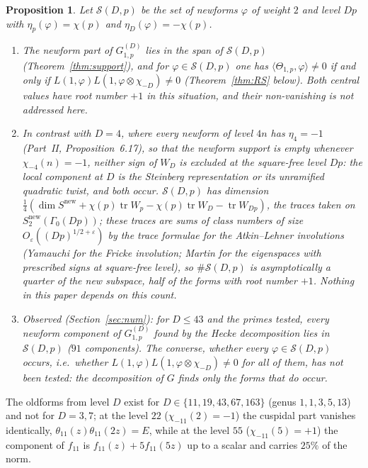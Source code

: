 \documentclass[11pt]{amsart}
\newtheorem{proposition}[theorem]{Proposition}
\theoremstyle{remark}
\newcommand{\e}{\varepsilon}
\DeclareMathOperator{\tr}{tr}
\begin{document}
\begin{proposition}\label{prop:whatproved}
Let $\mathcal S(D,p)$ be the set of newforms $\varphi$ of weight $2$ and level $Dp$ with $\eta_p(\varphi)=\chi(p)$ and $\eta_D(\varphi)=-\chi(p)$.
\begin{enumerate}[label=\textup{(\roman*)},leftmargin=2.2em]
\item The newform part of $G^{(D)}_{1,p}$ lies in the span of $\mathcal S(D,p)$ (Theorem~\ref{thm:support}), and for $\varphi\in\mathcal S(D,p)$ one has $\langle\Theta_{1,p},\varphi\rangle\ne0$ if and only if $L(1,\varphi)L(1,\varphi\otimes\chi_{-D})\ne0$ (Theorem~\ref{thm:RS} below). Both central values have root number $+1$ in this situation, and their non-vanishing is not addressed here.
\item In contrast with $D=4$, where every newform of level $4n$ has $\eta_4=-1$ (Part~II, Proposition~6.17), so that the newform support is empty whenever $\chi_{-4}(n)=-1$, neither sign of $W_D$ is excluded at the square-free level $Dp$: the local component at $D$ is the Steinberg representation or its unramified quadratic twist, and both occur. $\mathcal S(D,p)$ has dimension $\frac14(\dim S^{\mathrm{new}}+\chi(p)\tr W_p-\chi(p)\tr W_D-\tr W_{Dp})$, the traces taken on $S_2^{\mathrm{new}}(\Gamma_0(Dp))$; these traces are sums of class numbers of size $O_\e((Dp)^{1/2+\e})$ by the trace formulae for the Atkin--Lehner involutions (Yamauchi \cite{Yamauchi} for the Fricke involution; Martin \cite{Martin} for the eigenspaces with prescribed signs at square-free level), so $\#\mathcal S(D,p)$ is asymptotically a quarter of the new subspace, half of the forms with root number $+1$. Nothing in this paper depends on this count.
\item \emph{Observed} (Section~\ref{sec:num}): for $D\le43$ and the primes tested, every newform component of $G^{(D)}_{1,p}$ found by the Hecke decomposition lies in $\mathcal S(D,p)$ ($91$ components). The converse, whether every $\varphi\in\mathcal S(D,p)$ occurs, i.e.\ whether $L(1,\varphi)L(1,\varphi\otimes\chi_{-D})\ne0$ for all of them, has not been tested: the decomposition of $G$ finds only the forms that do occur.
\end{enumerate}
\end{proposition}

The oldforms from level $D$ exist for $D\in\{11,19,43,67,163\}$ (genus $1,1,3,5,13$) and not for $D=3,7$; at the level $22$ ($\chi_{-11}(2)=-1$) the cuspidal part vanishes identically, $\theta_{11}(z)\theta_{11}(2z)=E$, while at the level $55$ ($\chi_{-11}(5)=+1$) the component of $f_{11}$ is $f_{11}(z)+5f_{11}(5z)$ up to a scalar and carries $25\%$ of the norm.
\end{document}
